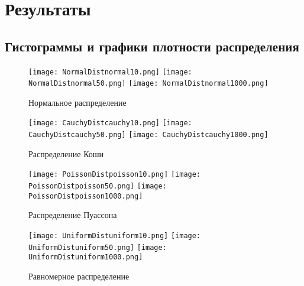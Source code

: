 \documentclass{article}
\begin{document}
\newpage

\section{Результаты}

\subsection{Гистограммы и графики плотности распределения}

\begin{figure}[!ht]
\begin{center}
\texttt{[image: NormalDistnormal10.png]}
\texttt{[image: NormalDistnormal50.png]}
\texttt{[image: NormalDistnormal1000.png]}
\caption{Нормальное распределение}\label{figure1}
\end{center}
\end{figure}

\begin{figure}[!ht]
\begin{center}
\texttt{[image: CauchyDistcauchy10.png]}
\texttt{[image: CauchyDistcauchy50.png]}
\texttt{[image: CauchyDistcauchy1000.png]}
\caption{Распределение Коши}\label{figure2}
\end{center}
\end{figure}

\begin{figure}[!ht]
\begin{center}
\texttt{[image: PoissonDistpoisson10.png]}
\texttt{[image: PoissonDistpoisson50.png]}
\texttt{[image: PoissonDistpoisson1000.png]}
\caption{Распределение Пуассона}\label{figure4}
\end{center}
\end{figure}

\begin{figure}[!ht]
\begin{center}
\texttt{[image: UniformDistuniform10.png]}
\texttt{[image: UniformDistuniform50.png]}
\texttt{[image: UniformDistuniform1000.png]}
\caption{Равномерное распределение}\label{figure5}
\end{center}
\end{figure}
~\\
~\\
~\\
~\\
~\\
~\\
~\\
~\\
~\\
\end{document}
